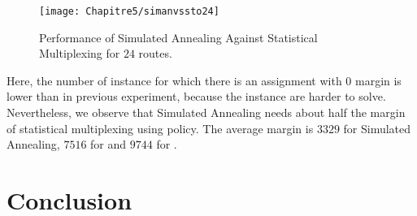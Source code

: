 \begin{center}

\begin{figure}[h]
  \centering
\texttt{[image: Chapitre5/simanvssto24]}
\caption{Performance of Simulated Annealing Against Statistical Multiplexing for $24$ routes.}
\label{fig:simanvssto24}
\end{figure}
\end{center}

Here, the number of instance for which there is an assignment with $0$ margin is lower than in previous experiment, because the instance are harder to solve. Nevertheless, we observe that Simulated Annealing needs about half the margin
of statistical multiplexing using \critdead policy. The average margin is $3329$ for Simulated Annealing, $7516$ for \critdead and $9744$ for \FIFO.



\section{Conclusion}